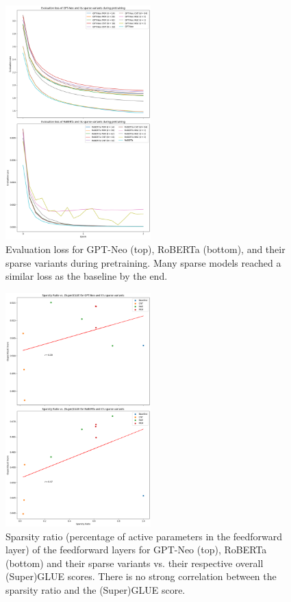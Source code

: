\begin{figure}[!h]
    \centering
    \includegraphics[width=0.5\textwidth]{evaluation_loss.png}
    \caption{Evaluation loss for GPT-Neo (top), RoBERTa (bottom), and their sparse variants during pretraining. Many sparse models reached a similar loss as the baseline by the end.}
    \label{fig:eval-loss}
\end{figure}

\begin{figure}[!h]
    \centering
    \includegraphics[width=0.5\textwidth]{sparsity_ratio_superglue.png}
    \caption{Sparsity ratio (percentage of active parameters in the feedforward layer) of the feedforward layers for GPT-Neo (top), RoBERTa (bottom) and their sparse variants vs. their respective overall (Super)GLUE scores. There is no strong correlation between the sparsity ratio and the (Super)GLUE score.}
    \label{fig:spar-rat-super}
\end{figure}

